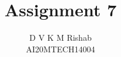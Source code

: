 \documentclass[journal,12pt,twocolumn]{IEEEtran}
\begin{document}
\makeatletter
{}
\makeatother
\let\StandardTheFigure\thefigure
\let\vec\mathbf
\def\putbox#1#2#3{\makebox[0in][l]{\makebox[#1][l]{}\raisebox{\baselineskip}[0in][0in]{\raisebox{#2}[0in][0in]{#3}}}}
     \def\rightbox#1{\makebox[0in][r]{#1}}
     \def\centbox#1{\makebox[0in]{#1}}
     \def\topbox#1{\raisebox{-\baselineskip}[0in][0in]{#1}}
     \def\midbox#1{\raisebox{-0.5\baselineskip}[0in][0in]{#1}}
\title{Assignment 7}
\author{D V K M Rishab \\ AI20MTECH14004}
%
%
%
% 
%
\end{document}
